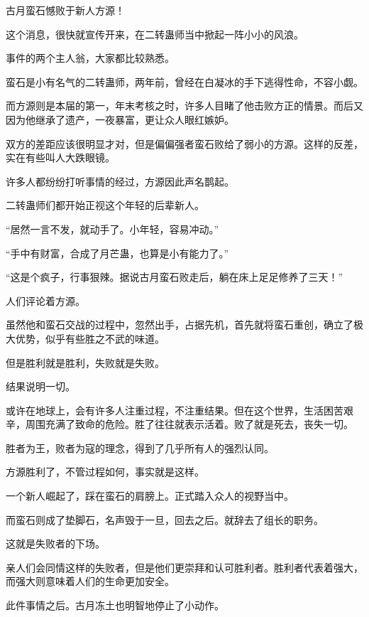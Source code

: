 
\begin{this_body}



古月蛮石憾败于新人方源！

这个消息，很快就宣传开来，在二转蛊师当中掀起一阵小小的风浪。

事件的两个主人翁，大家都比较熟悉。

蛮石是小有名气的二转蛊师，两年前，曾经在白凝冰的手下逃得性命，不容小觑。

而方源则是本届的第一，年末考核之时，许多人目睹了他击败方正的情景。而后又因为他继承了遗产，一夜暴富，更让众人眼红嫉妒。

双方的差距应该很明显才对，但是偏偏强者蛮石败给了弱小的方源。这样的反差，实在有些叫人大跌眼镜。

许多人都纷纷打听事情的经过，方源因此声名鹊起。

二转蛊师们都开始正视这个年轻的后辈新人。

“居然一言不发，就动手了。小年轻，容易冲动。”

“手中有财富，合成了月芒蛊，也算是小有能力了。”

“这是个疯子，行事狠辣。据说古月蛮石败走后，躺在床上足足修养了三天！”

人们评论着方源。

虽然他和蛮石交战的过程中，忽然出手，占据先机，首先就将蛮石重创，确立了极大优势，似乎有些胜之不武的味道。

但是胜利就是胜利，失败就是失败。

结果说明一切。

或许在地球上，会有许多人注重过程，不注重结果。但在这个世界，生活困苦艰辛，周围充满了致命的危险。胜了往往就表示活着。败了就是死去，丧失一切。

胜者为王，败者为寇的理念，得到了几乎所有人的强烈认同。

方源胜利了，不管过程如何，事实就是这样。

一个新人崛起了，踩在蛮石的肩膀上。正式踏入众人的视野当中。

而蛮石则成了垫脚石，名声毁于一旦，回去之后。就辞去了组长的职务。

这就是失败者的下场。

亲人们会同情这样的失败者，但是他们更崇拜和认可胜利者。胜利者代表着强大，而强大则意味着人们的生命更加安全。

此件事情之后。古月冻土也明智地停止了小动作。


\end{this_body}

